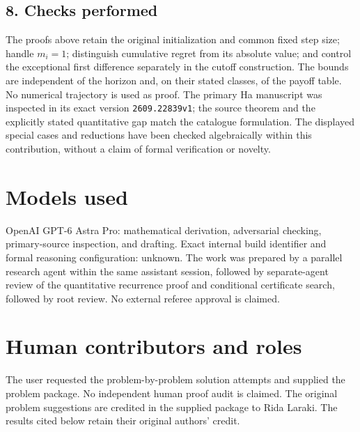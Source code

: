 \documentclass[11pt]{article}
\begin{document}
\subsection*{8. Checks performed}
The proofs above retain the original initialization and common fixed step
size; handle $m_i=1$; distinguish cumulative regret from its absolute
value; and control the exceptional first difference separately in the
cutoff construction. The bounds are independent of the horizon and, on
their stated classes, of the payoff table. No numerical trajectory is
used as proof. The primary Ha manuscript was inspected in its exact
version \texttt{2609.22839v1}; the source theorem and the explicitly
stated quantitative gap match the catalogue formulation. The displayed
special cases and reductions have been checked algebraically within this
contribution, without a claim of formal verification or novelty.

\section*{Models used}
OpenAI GPT-6 Astra Pro: mathematical derivation, adversarial checking,
primary-source inspection, and drafting. Exact internal build identifier
and formal reasoning configuration: unknown. The work was prepared by a
parallel research agent within the same assistant session, followed by
separate-agent review of the quantitative recurrence proof and conditional
certificate search, followed by root review.
No external referee approval is claimed.

\section*{Human contributors and roles}
The user requested the problem-by-problem solution attempts and supplied
the problem package. No independent human proof audit is claimed.
The original problem suggestions are credited in the supplied package to
Rida Laraki. The results cited below retain their original authors' credit.
\end{document}

